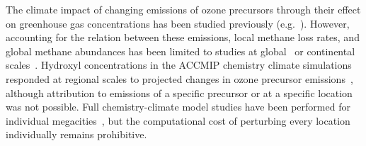 The climate impact of changing emissions of ozone precursors through their effect on greenhouse gas concentrations has been studied previously (e.g.~\citet{ref:shindell2013}). However, accounting for the relation between these emissions, local methane loss rates, and global methane abundances has been limited to studies at global~\citep{ref:prather2001,ref:fry2012,ref:holmes2013} or continental scales~\citep{ref:naik2005,ref:macintosh2015}.  Hydroxyl concentrations in the ACCMIP chemistry climate simulations responded at regional scales to projected changes in ozone precursor emissions~\citep{ref:voulgarakis2013}, although attribution to emissions of a specific precursor or at a specific location was not possible. Full chemistry-climate model studies have been performed for individual megacities~\citep{ref:dang2015}, but the computational cost of perturbing every location individually remains prohibitive. 






